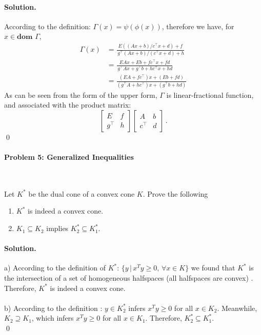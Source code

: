 \documentclass[a4paper]{article}
\newenvironment{solution}
{\color{blue} \paragraph{Solution.}}
{\newline \qed}
\begin{document}
\begin{solution}
    According to the definition: $\Gamma(x)=\psi(\phi(x))$, therefore we have, for $x \in \textbf{dom } \Gamma$,
\begin{equation}\nonumber
\begin{aligned}
\Gamma(x) &= \frac{E((Ax+b)/c^\top x + d)+f}{\,g^\top(Ax+b)/(c^\top x + d) + h}\\&= \frac{EAx + Eb + fc^\top x + fd}{\,g^\top Ax + g^\top b + hc^\top x + hd}\\&= \frac{(EA + fc^\top)x + (Eb + fd)}{(g^\top A + hc^\top)x + (g^\top b + hd)}
\end{aligned}
\end{equation}
As can be seen from the form of the upper form, $\Gamma$ is linear-fractional function, and associated with the product matrix:
\begin{equation}\nonumber
  \left[\begin{matrix}
   E & f \\
   g^\top & h
  \end{matrix}\right]
  \left[\begin{matrix}
   A & b \\
   c^\top & d
  \end{matrix}\right]\,.
\end{equation}
\end{solution}

\paragraph{Problem 5: Generalized Inequalities}
~

Let $K^*$ be the dual cone of a convex cone $K$. Prove the following
\begin{enumerate}[1)]
    \item $K^*$ is indeed a convex cone.
    \item $K_1 \subseteq K_2$ implies $K_2^* \subseteq K_1^*$.
\end{enumerate}

\begin{solution}
    a) According to the definition of $K^*$: $\{  y\,|\,x^Ty \geq 0 ,\,\forall x \in K\}$ we found that $K^*$ is the intersection of a set of homogeneous halfspaces (all halfspaces are convex) . Therefore, $K^*$ is indeed a convex cone. \\
	\\b) According to the definition : $y \in K_2^*$ infers $x^Ty \geq 0$ for all $x \in K_2$. Meanwhile, $K_2 \supseteq K_1$, which infers $x^Ty \geq 0$ for all $x \in K_1$. Therefore, $K_2^* \subseteq K_1^*$. \\
\end{solution}
\end{document}
